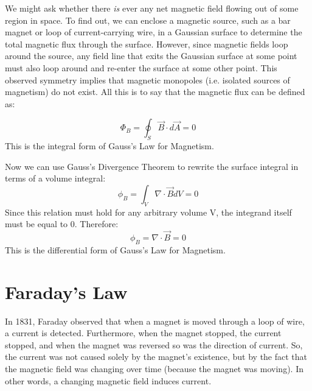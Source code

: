\documentclass{article}
\begin{document}
\vspace{3em}

We might ask whether there \textit{is} ever any net magnetic field flowing out of some region in space. To find out, we can enclose a magnetic source, such as a bar magnet or loop of current-carrying wire, in a Gaussian surface to determine the total magnetic flux through the surface. However, since magnetic fields loop around the source, any field line that exits the Gaussian surface at some point must also loop around and re-enter the surface at some other point. This observed symmetry implies that magnetic monopoles (i.e. isolated sources of magnetism) do not exist. All this is to say that the magnetic flux can be defined as:

\begin{equation}
\boxed{\Phi_B = \oint_S \vec B \cdot d\vec A = 0}
\end{equation}
This is the integral form of Gauss's Law for Magnetism.

\vspace{1em}
Now we can use Gauss's Divergence Theorem to rewrite the surface integral in terms of a volume integral:
\begin{equation}
\phi_B = \int_V \nabla \cdot \vec B dV = 0
\end{equation}
Since this relation must hold for any arbitrary volume V, the integrand itself must be equal to 0. Therefore:
\begin{equation}
\boxed{\phi_B = \nabla \cdot \vec B = 0}
\end{equation}
This is the differential form of Gauss's Law for Magnetism.

\pagebreak
\section{Faraday's Law}

In 1831, Faraday observed that when a magnet is moved through a loop of wire, a current is detected. Furthermore, when the magnet stopped, the current stopped, and when the magnet was reversed so was the direction of current. So, the current was not caused solely by the magnet's existence, but by the fact that the magnetic field was changing over time (because the magnet was moving). In other words, a changing magnetic field induces current.
\end{document}
